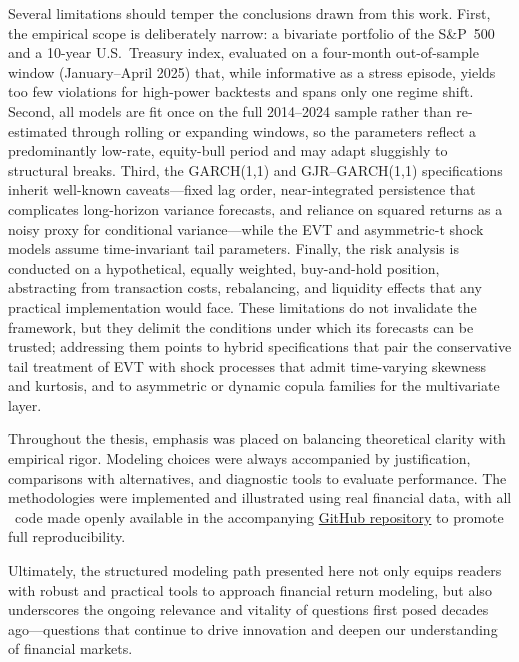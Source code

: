 Several limitations should temper the conclusions drawn from this work. First, the empirical scope is deliberately narrow: a bivariate portfolio of the S\&P~500 and a 10-year U.S.\ Treasury index, evaluated on a four-month out-of-sample window (January--April 2025) that, while informative as a stress episode, yields too few violations for high-power backtests and spans only one regime shift. Second, all models are fit once on the full 2014--2024 sample rather than re-estimated through rolling or expanding windows, so the parameters reflect a predominantly low-rate, equity-bull period and may adapt sluggishly to structural breaks. Third, the GARCH(1,1) and GJR--GARCH(1,1) specifications inherit well-known caveats---fixed lag order, near-integrated persistence that complicates long-horizon variance forecasts, and reliance on squared returns as a noisy proxy for conditional variance---while the EVT and asymmetric-t shock models assume time-invariant tail parameters. Finally, the risk analysis is conducted on a hypothetical, equally weighted, buy-and-hold position, abstracting from transaction costs, rebalancing, and liquidity effects that any practical implementation would face. These limitations do not invalidate the framework, but they delimit the conditions under which its forecasts can be trusted; addressing them points to hybrid specifications that pair the conservative tail treatment of EVT with shock processes that admit time-varying skewness and kurtosis, and to asymmetric or dynamic copula families for the multivariate layer.

Throughout the thesis, emphasis was placed on balancing theoretical
clarity with empirical rigor. Modeling choices were always accompanied
by justification, comparisons with alternatives, and diagnostic tools
to evaluate performance. The methodologies were implemented and illustrated using real financial data, with all \Rlogo\ code made openly available in the accompanying \href{https://github.com/ferpmillan/thesis}{GitHub repository} to promote full
reproducibility.

Ultimately, the structured modeling path presented here not only equips
readers with robust and practical tools to approach financial return
modeling, but also underscores the ongoing relevance and vitality of
questions first posed decades ago—questions that continue to drive
innovation and deepen our understanding of financial markets.